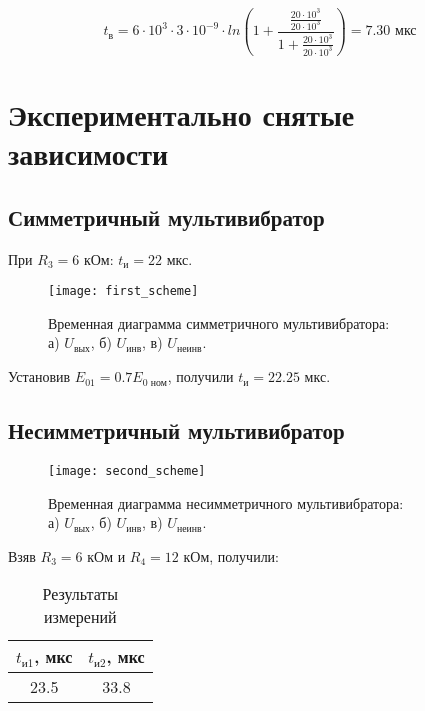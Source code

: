 \begin{displaymath}
	t_{\text{в}} = 6 \cdot 10^3 \cdot 3 \cdot 10^{-9} \cdot ln\left(1 + \frac{\frac{20 \cdot 10^3}{20 \cdot 10^3}}{1 + \frac{20 \cdot 10^3}{20 \cdot 10^3}}\right) = 7.30 \text{ мкс}
\end{displaymath}

\newpage

\section{Экспериментально снятые зависимости}

\subsection{Симметричный мультивибратор}

При $R_3 = 6$ кОм: $t_\text{и} = 22$ мкс.

\begin{figure}[H]
\begin{center}
	\texttt{[image: first\_scheme]}
	\captionsetup{margin=0cm}
	\caption{Временная диаграмма симметричного мультивибратора:\\ а) $U_\text{вых}$, б) $U_\text{инв}$, в) $U_\text{неинв}$.} 
	\label{fig:diff}
\end{center}
\end{figure}

Установив $E_{01} = 0.7 E_\text{0\ ном}$, получили $t_\text{и} = 22.25$ мкс.

\subsection{Несимметричный мультивибратор}

\begin{figure}[H]
\begin{center}
	\texttt{[image: second\_scheme]}
	\captionsetup{margin=0cm}
	\caption{Временная диаграмма несимметричного мультивибратора:\\ а) $U_\text{вых}$, б) $U_\text{инв}$, в) $U_\text{неинв}$.} 
	\label{fig:diff}
\end{center}
\end{figure}

Взяв $R_3 = 6$ кОм и $R_4 = 12$ кОм, получили:

\begin{table}[H]
\begin{center}
	\caption{Результаты измерений}
	\def\tabcolsep{10pt}
	\begin{tabular}{|c|c|}
		\hline
		$t_{\text{и1}}$, мкс &
		$t_{\text{и2}}$, мкс \\
		\hline
		23.5 &
		33.8 \\
	    \hline	
	\end{tabular}
\end{center}
\end{table}

